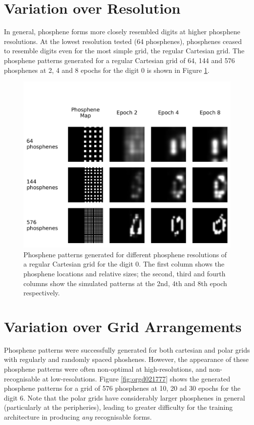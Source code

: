 \documentclass[a4paper,11pt,openany]{book}
\begin{document}
\section*{Variation over Resolution}
\label{sec:org2b33961}

In general, phosphene forms more closely resembled digits at higher phosphene resolutions.
At the lowest resolution tested (64 phosphenes), phosphenes ceased to resemble digits even for the most simple grid, the regular Cartesian grid.
The phosphene patterns generated for a regular Cartesian grid of 64, 144 and 576 phosphenes at 2, 4 and 8 epochs for the digit 0 is shown in Figure \ref{fig:org1f82f03}.

\begin{figure}[htbp]
\centering
\includegraphics[width=.9\linewidth]{./images/results_different_resolution.png}
\caption{\label{fig:org1f82f03}
Phosphene patterns generated for different phosphene resolutions of a regular Cartesian grid for the digit 0. The first column shows the phosphene locations and relative sizes; the second, third and fourth columns show the simulated patterns at the 2nd, 4th and 8th epoch respectively.}
\end{figure}

\section*{Variation over Grid Arrangements}
\label{sec:org94aef67}

Phosphene patterns were successfully generated for both cartesian and polar grids with regularly and randomly spaced phoshenes.
However, the appearance of these phosphene patterns were often non-optimal at high-resolutions, and non-recognisable at low-resolutions.
Figure \ref{fig:orgd021777} shows the generated phosphene patterns for a grid of 576 phosphenes at 10, 20 ad 30 epochs for the digit 6.
Note that the polar grids have considerably larger phosphenes in general (particularly at the peripheries), leading to greater difficulty for the training architecture in producing \emph{any} recognisable forms.
\end{document}
